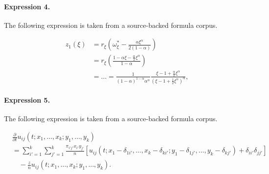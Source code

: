 \documentclass[11pt]{article}
\begin{document}
\paragraph{Expression 4.} The following expression is taken from a source-backed formula corpus.

\begin{align*}z_1(\xi) & = r_{\xi}(\omega_{\xi}^{\ast} - \frac{\alpha \xi^{\alpha}}{2(1 - \alpha)}) \\& = r_{\xi}(\frac{1 - \alpha \xi - \frac{\alpha}{2}\xi^{\alpha}}{1 - \alpha}) \\& = \ldots = \frac{1}{(1-\alpha)^{1 - \alpha}\alpha^{\alpha}} \frac{\xi - 1 + \frac{\alpha}{2}\xi^{\alpha}}{(\xi - 1 + \frac{1}{2}\xi^{\alpha})^{\alpha}},\end{align*}

\paragraph{Expression 5.} The following expression is taken from a source-backed formula corpus.

\begin{align*}&\frac{\partial}{\partial t}u_{ij}(t;x_1,\ldots,x_k;y_1,\ldots,y_k)\\&= \sum_{i'=1}^k\sum_{j'=1}^k\frac{\pi_{i'j'}x_{i'}y_{j'}}{n}\left[u_{ij}(t;x_1-\delta_{1i'},\ldots,x_k-\delta_{ki'};y_1-\delta_{1j'},\ldots,y_k-\delta_{kj'}) + \delta_{ii'}\delta_{jj'}\right]\\&\quad- \frac{z}{n}u_{ij}(t;x_1,\ldots,x_k;y_1,\ldots,y_k).\end{align*}
\end{document}
